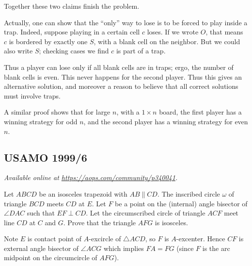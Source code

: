 \documentclass[11pt]{scrartcl}
\begin{document}
Together these two claims finish the problem.

\begin{remark*}
  Actually, one can show that the ``only'' way to lose
  is to be forced to play inside a trap.
  Indeed, suppose playing in a certain cell $c$ loses.
  If we wrote $O$, that means $c$ is bordered by exactly one $S$,
  with a blank cell on the neighbor.
  But we could also write $S$; checking cases we find $c$
  is part of a trap.

  Thus a player can lose only if all blank cells
  are in traps; ergo, the number of blank cells is even.
  This never happens for the second player.
  Thus this gives an alternative solution,
  and moreover a reason to believe that all
  correct solutions must involve traps.

  A similar proof shows that for large $n$, with a $1 \times n$ board,
  the first player has a winning strategy for odd $n$,
  and the second player has a winning strategy for even $n$.
\end{remark*}
\pagebreak

\subsection{USAMO 1999/6}
\textsl{Available online at \url{https://aops.com/community/p340041}.}
\begin{mdframed}[style=mdpurplebox,frametitle={Problem statement}]
Let $ABCD$ be an isosceles trapezoid with $AB \parallel CD$.
The inscribed circle $\omega$ of triangle $BCD$ meets $CD$ at $E$.
Let $F$ be a point on the (internal) angle bisector of $\angle DAC$
such that $EF \perp CD$.
Let the circumscribed circle of triangle $ACF$
meet line $CD$ at $C$ and $G$.
Prove that the triangle $AFG$ is isosceles.
\end{mdframed}
Note $E$ is contact point of $A$-excircle of $\triangle ACD$,
so $F$ is $A$-excenter.
Hence $CF$ is external angle bisector of $\angle ACG$
which implies $FA = FG$
(since $F$ is the arc midpoint on the circumcircle of $AFG$).
\pagebreak
\end{document}

